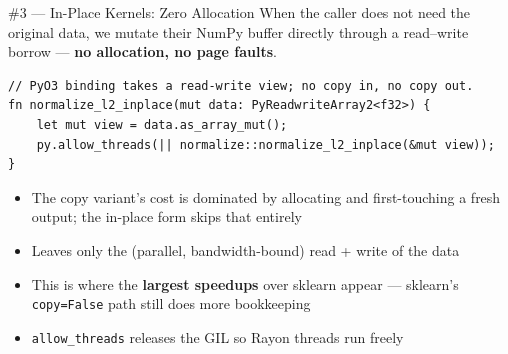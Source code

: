 \documentclass[aspectratio=169]{beamer}
\begin{document}
\begin{frame}[fragile]{\#3 — In-Place Kernels: Zero Allocation}
  When the caller does not need the original data, we mutate their NumPy buffer
  directly through a read--write borrow --- \textbf{no allocation, no page faults}.
\begin{lstlisting}
// PyO3 binding takes a read-write view; no copy in, no copy out.
fn normalize_l2_inplace(mut data: PyReadwriteArray2<f32>) {
    let mut view = data.as_array_mut();
    py.allow_threads(|| normalize::normalize_l2_inplace(&mut view));
}
\end{lstlisting}
  \begin{itemize}
    \item The copy variant's cost is dominated by allocating and first-touching a
          fresh output; the in-place form skips that entirely
    \item Leaves only the (parallel, bandwidth-bound) read + write of the data
    \item This is where the \textbf{largest speedups} over sklearn appear ---
          sklearn's \texttt{copy=False} path still does more bookkeeping
    \item \texttt{allow\_threads} releases the GIL so Rayon threads run freely
  \end{itemize}
\end{frame}
\end{document}
